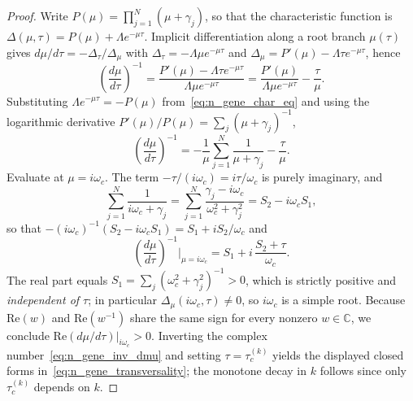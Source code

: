 \documentclass[sn-mathphys,Numbered]{sn-jnl}
\theoremstyle{thmstyleone}
\theoremstyle{thmstyletwo}
\theoremstyle{thmstylethree}
\begin{document}
\begin{proof}
Write $P(\mu)=\prod_{j=1}^N(\mu+\gamma_j)$, so that the characteristic
function is $\Delta(\mu,\tau)=P(\mu)+\Lambda e^{-\mu\tau}$. Implicit
differentiation along a root branch $\mu(\tau)$ gives
$d\mu/d\tau=-\Delta_\tau/\Delta_\mu$ with
$\Delta_\tau=-\Lambda\mu e^{-\mu\tau}$ and
$\Delta_\mu=P'(\mu)-\Lambda\tau e^{-\mu\tau}$, hence
\[
\left(\frac{d\mu}{d\tau}\right)^{-1}
=\frac{P'(\mu)-\Lambda\tau e^{-\mu\tau}}{\Lambda\mu e^{-\mu\tau}}
=\frac{P'(\mu)}{\Lambda\mu e^{-\mu\tau}}-\frac{\tau}{\mu}.
\]
Substituting $\Lambda e^{-\mu\tau}=-P(\mu)$ from~\eqref{eq:n_gene_char_eq}
and using the logarithmic derivative
$P'(\mu)/P(\mu)=\sum_j(\mu+\gamma_j)^{-1}$,
\[
\left(\frac{d\mu}{d\tau}\right)^{-1}
=-\frac{1}{\mu}\sum_{j=1}^N\frac{1}{\mu+\gamma_j}-\frac{\tau}{\mu}.
\]
Evaluate at $\mu=i\omega_c$. The term $-\tau/(i\omega_c)=i\tau/\omega_c$
is purely imaginary, and
\[
\sum_{j=1}^N\frac{1}{i\omega_c+\gamma_j}
=\sum_{j=1}^N\frac{\gamma_j-i\omega_c}{\omega_c^{2}+\gamma_j^{2}}
=S_2-i\omega_c S_1,
\]
so that $-(i\omega_c)^{-1}(S_2-i\omega_c S_1)=S_1+iS_2/\omega_c$ and
\begin{equation}
\left(\frac{d\mu}{d\tau}\right)^{-1}\!\bigg|_{\mu=i\omega_c}
=S_1+i\,\frac{S_2+\tau}{\omega_c}.
\label{eq:n_gene_inv_dmu}
\end{equation}
The real part equals $S_1=\sum_j(\omega_c^{2}+\gamma_j^{2})^{-1}>0$,
which is strictly positive and \emph{independent of $\tau$}; in
particular $\Delta_\mu(i\omega_c,\tau)\neq0$, so $i\omega_c$ is a simple
root. Because $\mathrm{Re}(w)$ and $\mathrm{Re}(w^{-1})$ share the same
sign for every nonzero $w\in\mathbb{C}$, we conclude
$\mathrm{Re}(d\mu/d\tau)|_{i\omega_c}>0$. Inverting the complex
number~\eqref{eq:n_gene_inv_dmu} and setting $\tau=\tau_c^{(k)}$ yields
the displayed closed forms in~\eqref{eq:n_gene_transversality}; the
monotone decay in $k$ follows since only $\tau_c^{(k)}$ depends on $k$.
\end{proof}
\end{document}
